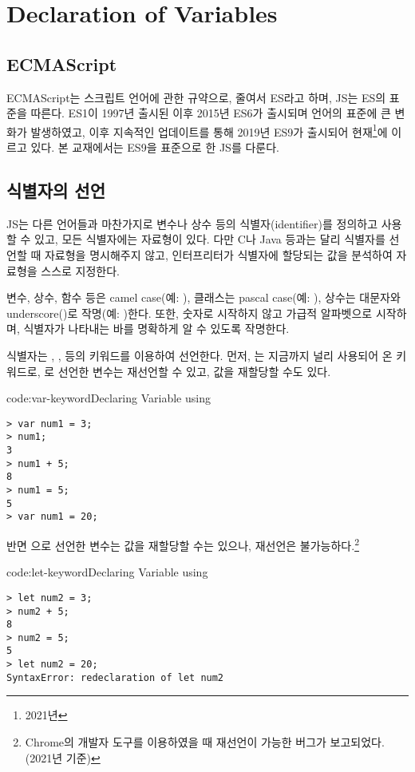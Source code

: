 \section{Declaration of Variables} \label{sect:declaration-of-variables}

\subsection*{ECMAScript}

ECMAScript는 스크립트 언어에 관한 규약으로, 줄여서 ES라고 하며, JS는 ES의 표준을 따른다. ES1이 1997년 출시된 이후 2015년 ES6가 출시되며 언어의 표준에 큰 변화가 발생하였고, 이후 지속적인 업데이트를 통해 2019년 ES9가 출시되어 현재\footnote{2021년}에 이르고 있다. 본 교재에서는 ES9을 표준으로 한 JS를 다룬다.

\subsection*{식별자의 선언}

JS는 다른 언어들과 마찬가지로 변수나 상수 등의 식별자(identifier)를 정의하고 사용할 수 있고, 모든 식별자에는 자료형이 있다. 다만 C나 Java 등과는 달리 식별자를 선언할 때 자료형을 명시해주지 않고, 인터프리터가 식별자에 할당되는 값을 분석하여 자료형을 스스로 지정한다.

변수, 상수, 함수 등은 camel case(예: ), 클래스는 pascal case(예: ), 상수는 대문자와 underscore(\cd{\_})로 작명(예: )한다. 또한, 숫자로 시작하지 않고 가급적 알파벳으로 시작하며, 식별자가 나타내는 바를 명확하게 알 수 있도록 작명한다.

식별자는 , ,  등의 키워드를 이용하여 선언한다. 먼저, 는 지금까지 널리 사용되어 온 키워드로, 로 선언한 변수는 재선언할 수 있고, 값을 재할당할 수도 있다.

\begin{codeenv}{code:var-keyword}{Declaring Variable using }\begin{verbatim}
> var num1 = 3;
> num1;
3
> num1 + 5;
8
> num1 = 5;
5
> var num1 = 20;
\end{verbatim}
\end{codeenv}

반면 으로 선언한 변수는 값을 재할당할 수는 있으나, 재선언은 불가능하다.\footnote{Chrome의 개발자 도구를 이용하였을 때 재선언이 가능한 버그가 보고되었다. (2021년 기준)}

\begin{codeenv}{code:let-keyword}{Declaring Variable using }\begin{verbatim}
> let num2 = 3;
> num2 + 5;
8
> num2 = 5;
5
> let num2 = 20;
SyntaxError: redeclaration of let num2
\end{verbatim}
\end{codeenv}


